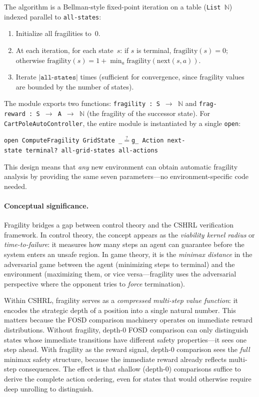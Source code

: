 \documentclass[9pt,a4paper]{article}
\theoremstyle{plain}
\theoremstyle{definition}
\theoremstyle{remark}
\begin{document}
The algorithm is a Bellman-style fixed-point iteration on a table (\texttt{List~$\mathbb{N}$}) indexed parallel to \texttt{all-states}:

\begin{enumerate}
\item Initialize all fragilities to~0.
\item At each iteration, for each state~$s$: if $s$ is terminal, $\text{fragility}(s) = 0$; otherwise $\text{fragility}(s) = 1 + \min_a \text{fragility}(\text{next}(s,a))$.
\item Iterate $|\texttt{all-states}|$ times (sufficient for convergence, since fragility values are bounded by the number of states).
\end{enumerate}

The module exports two functions: \texttt{fragility~:~S~$\to$~$\mathbb{N}$} and \texttt{frag-reward~:~S~$\to$~A~$\to$~$\mathbb{N}$} (the fragility of the successor state).  For \texttt{CartPoleAutoController}, the entire module is instantiated by a single \texttt{open}:
\begin{center}
\texttt{open~ComputeFragility~GridState~\_$\stackrel{?}{=}$g\_~Action~next-state~terminal?~all-grid-states~all-actions}
\end{center}

This design means that \emph{any} new environment can obtain automatic fragility analysis by providing the same seven parameters---no environment-specific code needed.

\paragraph{Conceptual significance.}
Fragility bridges a gap between control theory and the CSHRL verification framework.  In control theory, the concept appears as the \emph{viability kernel radius} or \emph{time-to-failure}: it measures how many steps an agent can guarantee before the system enters an unsafe region.  In game theory, it is the \emph{minimax distance} in the adversarial game between the agent (minimizing steps to terminal) and the environment (maximizing them, or vice versa---fragility uses the adversarial perspective where the opponent tries to \emph{force} termination).

Within CSHRL, fragility serves as a \emph{compressed multi-step value function}: it encodes the strategic depth of a position into a single natural number.  This matters because the FOSD comparison machinery operates on immediate reward distributions.  Without fragility, depth-0 FOSD comparison can only distinguish states whose immediate transitions have different safety properties---it sees one step ahead.  With fragility as the reward signal, depth-0 comparison sees the \emph{full} minimax safety structure, because the immediate reward already reflects multi-step consequences.  The effect is that shallow (depth-0) comparisons suffice to derive the complete action ordering, even for states that would otherwise require deep unrolling to distinguish.
\end{document}
